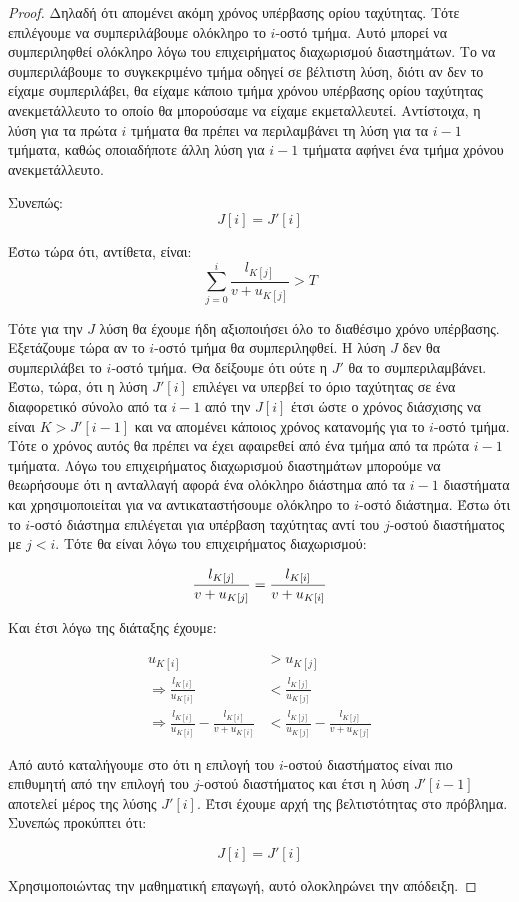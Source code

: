 \documentclass[11pt,a4paper]{book}
\begin{document}
\begin{proof}
Δηλαδή ότι απομένει ακόμη χρόνος υπέρβασης ορίου ταχύτητας. Τότε επιλέγουμε να συμπεριλάβουμε ολόκληρο το $i$-οστό τμήμα. Αυτό μπορεί να συμπεριληφθεί ολόκληρο λόγω του επιχειρήματος διαχωρισμού διαστημάτων. Το να συμπεριλάβουμε το συγκεκριμένο τμήμα οδηγεί σε βέλτιστη λύση, διότι αν δεν το είχαμε συμπεριλάβει, θα είχαμε κάποιο τμήμα χρόνου υπέρβασης ορίου ταχύτητας ανεκμετάλλευτο το οποίο θα μπορούσαμε να είχαμε εκμεταλλευτεί. Αντίστοιχα, η λύση για τα πρώτα $i$ τμήματα θα πρέπει να περιλαμβάνει τη λύση για τα $i - 1$ τμήματα, καθώς οποιαδήποτε άλλη λύση για $i - 1$ τμήματα αφήνει ένα τμήμα χρόνου ανεκμετάλλευτο.

Συνεπώς:
\[
J[ i ] = J'[ i ]
\]

Έστω τώρα ότι, αντίθετα, είναι:
\[
\sum_{j=0}^{i} \frac{l_{K[ j ]}}{v + u_{K[ j ]}} > T
\]

Τότε για την $J$ λύση θα έχουμε ήδη αξιοποιήσει όλο το διαθέσιμο χρόνο υπέρβασης. Εξετάζουμε τώρα αν το $i$-οστό τμήμα θα συμπεριληφθεί. Η λύση $J$ δεν θα συμπεριλάβει το $i$-οστό τμήμα. Θα δείξουμε ότι ούτε η $J'$ θα το συμπεριλαμβάνει. Έστω, τώρα, ότι η λύση $J'[ i ]$ επιλέγει να υπερβεί το όριο ταχύτητας σε ένα διαφορετικό σύνολο από τα $i - 1$ από την $J[ i ]$ έτσι ώστε ο χρόνος διάσχισης να είναι $K > J'[ i - 1 ]$ και να απομένει κάποιος χρόνος κατανομής για το $i$-οστό τμήμα. Τότε ο χρόνος αυτός θα πρέπει να έχει αφαιρεθεί από ένα τμήμα από τα πρώτα $i - 1$ τμήματα. Λόγω του επιχειρήματος διαχωρισμού διαστημάτων μπορούμε να θεωρήσουμε ότι η ανταλλαγή αφορά ένα ολόκληρο διάστημα από τα $i - 1$ διαστήματα και χρησιμοποιείται για να αντικαταστήσουμε ολόκληρο το $i$-οστό διάστημα. Έστω ότι το $i$-οστό διάστημα επιλέγεται για υπέρβαση ταχύτητας αντί του $j$-οστού διαστήματος με $j < i$. Τότε θα είναι λόγω του επιχειρήματος διαχωρισμού:

\[
\frac{l_{K[ j ]}}{v + u_{K[ j ]}} = \frac{l_{K[ i ]}}{v + u_{K[ i ]}}\\
\]

Και έτσι λόγω της διάταξης έχουμε:

\begin{align*}
{u_{K[ i ]}} & > {u_{K[ j ]}} \\
\Rightarrow \frac{l_{K[ i ]}}{u_{K[ i ]}} & < \frac{l_{K[ j ]}}{u_{K[ j ]}} \\
\Rightarrow \frac{l_{K[ i ]}}{u_{K[ i ]}} - \frac{l_{K[ i ]}}{v + u_{K[ i ]}} & < \frac{l_{K[ j ]}}{u_{K[ j ]}} - \frac{l_{K[ j ]}}{v + u_{K[ j ]}}
\end{align*}

Από αυτό καταλήγουμε στο ότι η επιλογή του $i$-οστού διαστήματος είναι πιο επιθυμητή από την επιλογή του $j$-οστού διαστήματος και έτσι η λύση $J'[ i - 1 ]$ αποτελεί μέρος της λύσης $J'[ i ]$. Έτσι έχουμε αρχή της βελτιστότητας στο πρόβλημα. Συνεπώς προκύπτει ότι:

\[
J[ i ] = J'[ i ]
\]

Χρησιμοποιώντας την μαθηματική επαγωγή, αυτό ολοκληρώνει την απόδειξη.
\end{proof}
\end{document}
